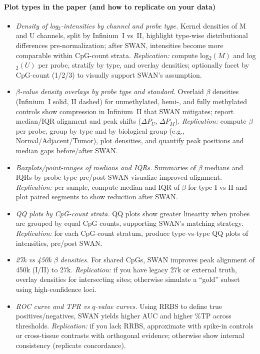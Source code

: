 \documentclass[10pt]{extarticle}
\begin{document}
\paragraph{Plot types in the paper (and how to replicate on your data)}
\begin{itemize}[label=-]
    \item \textit{Density of log$_2$-intensities by channel and probe type.} Kernel densities of M and U channels, split by Infinium~I vs~II, highlight type-wise distributional differences pre-normalization; after SWAN, intensities become more comparable within CpG-count strata. \emph{Replication:} compute log$_2(M)$ and log$_2(U)$ per probe, stratify by type, and overlay densities; optionally facet by CpG-count (1/2/3) to visually support SWAN’s assumption.
    \item \textit{$\beta$-value density overlays by probe type and standard.} Overlaid $\beta$ densities (Infinium~I solid, II dashed) for unmethylated, hemi-, and fully methylated controls show compression in Infinium~II that SWAN mitigates; report median/IQR alignment and peak shifts ($\Delta P_U$, $\Delta P_M$). \emph{Replication:} compute $\beta$ per probe, group by type and by biological group (e.g., Normal/Adjacent/Tumor), plot densities, and quantify peak positions and median gaps before/after SWAN.
    \item \textit{Boxplots/point-ranges of medians and IQRs.} Summaries of $\beta$ medians and IQRs by probe type pre/post SWAN visualize improved alignment. \emph{Replication:} per sample, compute median and IQR of $\beta$ for type I vs II and plot paired segments to show reduction after SWAN.
    \item \textit{QQ plots by CpG-count strata.} QQ plots show greater linearity when probes are grouped by equal CpG counts, supporting SWAN’s matching strategy. \emph{Replication:} for each CpG-count stratum, produce type-vs-type QQ plots of intensities, pre/post SWAN.
    \item \textit{27k vs 450k $\beta$ densities.} For shared CpGs, SWAN improves peak alignment of 450k (I/II) to 27k. \emph{Replication:} if you have legacy 27k or external truth, overlay densities for intersecting sites; otherwise simulate a “gold” subset using high-confidence loci.
    \item \textit{ROC curve and TPR vs $q$-value curves.} Using RRBS to define true positives/negatives, SWAN yields higher AUC and higher \%TP across thresholds. \emph{Replication:} if you lack RRBS, approximate with spike-in controls or cross-tissue contrasts with orthogonal evidence; otherwise show internal consistency (replicate concordance).
\end{itemize}
\end{document}
